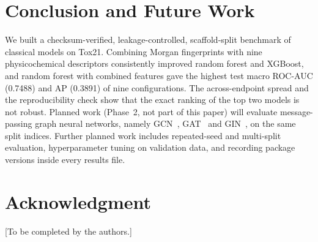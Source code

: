 \documentclass[conference]{IEEEtran}
\begin{document}
\section{Conclusion and Future Work}
We built a checksum-verified, leakage-controlled, scaffold-split benchmark of classical models on Tox21. Combining Morgan fingerprints with nine physicochemical descriptors consistently improved random forest and XGBoost, and random forest with combined features gave the highest test macro ROC-AUC (0.7488) and AP (0.3891) of nine configurations. The across-endpoint spread and the reproducibility check show that the exact ranking of the top two models is not robust. Planned work (Phase~2, not part of this paper) will evaluate message-passing graph neural networks, namely GCN~\cite{kipf2017gcn}, GAT~\cite{velickovic2018gat} and GIN~\cite{xu2019gin}, on the same split indices. Further planned work includes repeated-seed and multi-split evaluation, hyperparameter tuning on validation data, and recording package versions inside every results file.

\section*{Acknowledgment}
[To be completed by the authors.]



\end{document}
